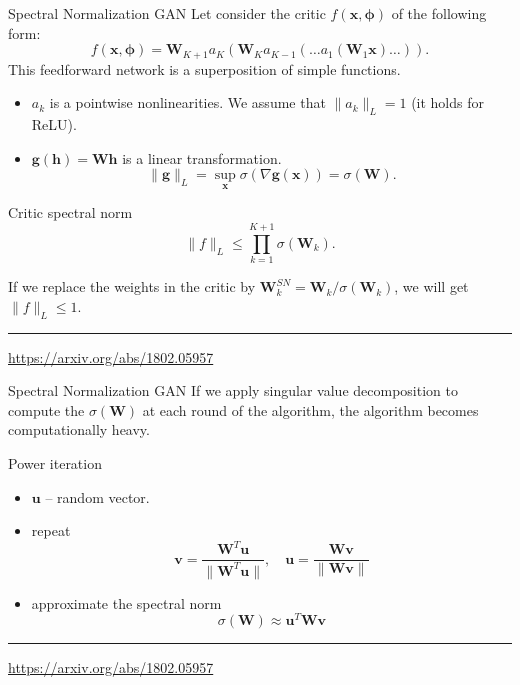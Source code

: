 \documentclass{beamer}
\newcommand{\bh}{\mathbf{h}}
\newcommand{\bu}{\mathbf{u}}
\newcommand{\bv}{\mathbf{v}}
\newcommand{\bx}{\mathbf{x}}
\newcommand{\bW}{\mathbf{W}}
\newcommand{\bphi}{\boldsymbol{\phi}}
\begin{document}
\begin{frame}{Spectral Normalization GAN}
	Let consider the critic $f(\bx, \bphi)$ of the following form:
	\[
		f(\bx, \bphi) = \bW_{K+1} a_K (\bW_K a_{K-1}(\dots a_1(\bW_1 \bx) \dots)).
	\]
	This feedforward network is a superposition of simple functions.
	\begin{itemize}
		\item $a_k$ is a pointwise nonlinearities. We assume that $\| a_k \|_L = 1$ (it holds for ReLU).
		\item $\mathbf{g}(\bh) = \bW \bh$ is a linear transformation.
		\[
			\| \mathbf{g} \|_L = \sup_\bx \sigma( \nabla \mathbf{g}(\bx)) = \sigma(\bW).
		\]
	\end{itemize}
	\vspace{-0.5cm}
	\begin{block}{Critic spectral norm}
		\vspace{-0.5cm}
		\[
			\| f \|_L \leq \prod_{k=1}^{K+1} \sigma(\bW_k).
		\]
	\end{block}
	If we replace the weights in the critic by $\bW^{SN}_k = \bW_k / \sigma(\bW_k)$, we will get $\| f\|_L \leq 1.$ \\
	
	\vspace{0.1cm}
	\vfill
	\hrule\medskip 
	{\scriptsize \href{https://arxiv.org/abs/1802.05957}{https://arxiv.org/abs/1802.05957}}
\end{frame}
\begin{frame}{Spectral Normalization GAN}
	 If we apply singular value decomposition to compute the $\sigma(\bW)$ at each round of the algorithm, the algorithm becomes computationally heavy.
	 \begin{block}{Power iteration}
	 	\begin{itemize}
	 		\item $\bu$ -- random vector.
	 		\item repeat
	 		\[
	 			\bv = \frac{\bW^T \bu}{\| \bW^T \bu \|}, \quad \bu = \frac{\bW \bv}{\| \bW \bv \|}
	 		\]
	 		\item approximate the spectral norm
	 		\[
	 			\sigma(\bW) \approx \bu^T \bW \bv
	 		\]
	 	\end{itemize}
	 \end{block}
	\vfill
	\hrule\medskip 
	{\scriptsize \href{https://arxiv.org/abs/1802.05957}{https://arxiv.org/abs/1802.05957}}
\end{frame}
\end{document}
